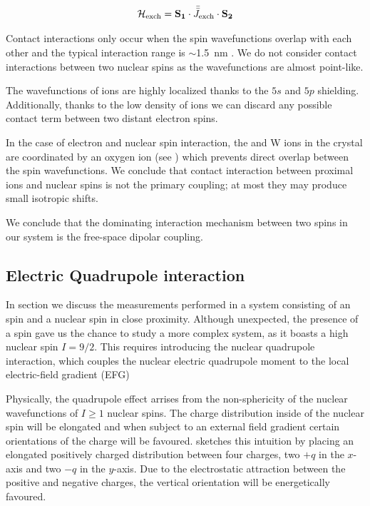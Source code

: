 \begin{equation}
    \mathcal{H}_{\text{exch}} = \mathbf{S_1} \cdot \bar{\bar {J}}_\text{exch} \cdot \mathbf{S_2}
\end{equation}

Contact interactions only occur when the spin wavefunctions overlap with each other and the typical interaction range is $\sim$1.5~nm . We do not consider contact interactions between two nuclear spins as the wavefunctions are almost point-like.

The wavefunctions of \Er ions are highly localized thanks to the $5s$ and $5p$ shielding. Additionally, thanks to the low density of \Er ions we can discard any possible contact term between two distant electron spins. 

In the case of electron and nuclear spin interaction, the \Er and W ions in the crystal are coordinated by an oxygen ion (see ) which prevents direct overlap between the spin wavefunctions. We conclude that contact interaction between proximal \Er ions and \W nuclear spins is not the primary coupling; at most they may produce small isotropic shifts.

We conclude that the dominating interaction mechanism between two spins in our system is the free-space dipolar coupling.

\subsection{Electric Quadrupole interaction}

In section  we discuss the measurements performed in a system consisting of an \Er spin and a \Nb nuclear spin in close proximity. Although unexpected, the presence of a \Nb spin gave us the chance to study a more complex system, as it boasts a high nuclear spin $I=9/2$. This requires introducing the nuclear quadrupole interaction, which couples the nuclear electric quadrupole moment to the local electric-field gradient (EFG)

Physically, the quadrupole effect arrises from the non-sphericity of the nuclear wavefunctions of $I\geq1$ nuclear spins. The charge distribution inside of the nuclear spin will be elongated and when subject to an external field gradient certain orientations of the charge will be favoured.  sketches this intuition by placing an elongated positively charged distribution between four charges, two $+q$ in the $x$-axis and two $-q$ in the $y$-axis. Due to the electrostatic attraction between the positive and negative charges, the vertical orientation will be energetically favoured.

